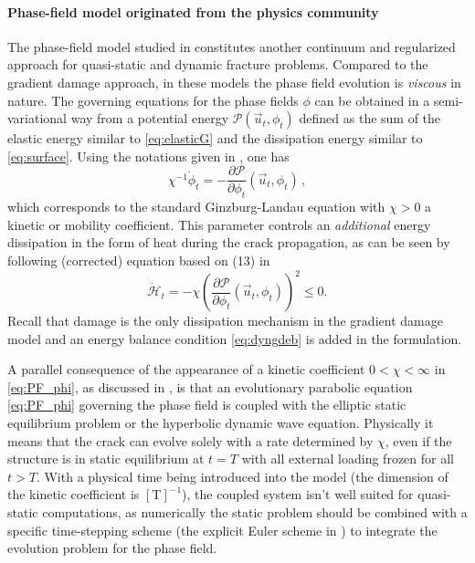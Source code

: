 \paragraph{Phase-field model originated from the physics community}
The phase-field model studied in \cite{KarmaKesslerLevine:2001,HakimKarma:2009} constitutes another continuum and regularized approach for quasi-static and dynamic fracture problems. Compared to the gradient damage approach, in these models the phase field evolution is \emph{viscous} in nature. The governing equations for the phase fields $\phi$ can be obtained in a semi-variational way from a potential energy $\mathcal{P}(\vec{u}_t,\phi_t)$ defined as the sum of the elastic energy similar to \eqref{eq:elasticG} and the dissipation energy similar to \eqref{eq:surface}. Using the notations given in \cite{HakimKarma:2009}, one has
\begin{equation} \label{eq:PF_phi}
\chi^{-1}\dot{\phi}_t=-\frac{\partial\mathcal{P}}{\partial\phi_t}(\vec{u}_t,\phi_t)\,,
\end{equation}
which corresponds to the standard Ginzburg-Landau equation with $\chi>0$ a kinetic or mobility \cite{KuhnMuller:2010} coefficient. This parameter controls an \emph{additional} energy dissipation in the form of heat during the crack propagation, as can be seen by following (corrected) equation based on (13) in \cite{HakimKarma:2009}
\begin{equation} \label{eq:PF_dissipation}
\dot{\mathcal{H}}_t=-\chi\left(\frac{\partial\mathcal{P}}{\partial\phi_t}(\vec{u}_t,\phi_t)\right)^2\leq 0.
\end{equation}
Recall that damage is the only dissipation mechanism in the gradient damage model and an energy balance condition \eqref{eq:dyngdeb} is added in the formulation.

A parallel consequence of the appearance of a kinetic coefficient $0<\chi<\infty$ in \eqref{eq:PF_phi}, as discussed in \cite{Bourdin:2011}, is that an evolutionary parabolic equation \eqref{eq:PF_phi} governing the phase field is coupled with the elliptic static equilibrium problem or the hyperbolic dynamic wave equation. Physically it means that the crack can evolve solely with a rate determined by $\chi$, even if the structure is in static equilibrium at $t=T$ with all external loading frozen for all $t>T$. With a physical time being introduced into the model (the dimension of the kinetic coefficient is $[\mathrm{T}]^{-1}$), the coupled system isn't well suited for quasi-static computations, as numerically the static problem should be combined with a specific time-stepping scheme (the explicit Euler scheme in \cite{HakimKarma:2009}) to integrate the evolution problem for the phase field.

